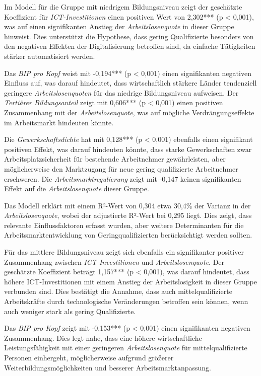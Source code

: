 Im Modell für die Gruppe mit niedrigem Bildungsniveau zeigt der geschätzte Koeffizient 
für \textit{\ac{ICT}-Investitionen} einen positiven Wert von 2,302*** (p < 0,001), was 
auf einen signifikanten Anstieg der \textit{Arbeitslosenquote} in dieser Gruppe hinweist. 
Dies unterstützt die Hypothese, dass gering Qualifizierte besonders von den negativen 
Effekten der Digitalisierung betroffen sind, da einfache Tätigkeiten stärker automatisiert 
werden.

Das \textit{\ac{BIP} pro Kopf} weist mit -0,194*** (p < 0,001) einen signifikanten 
negativen Einfluss auf, was darauf hindeutet, dass wirtschaftlich stärkere Länder 
tendenziell geringere \textit{Arbeitslosenquoten} für das niedrige Bildungsniveau 
aufweisen. Der \textit{Tertiärer Bildungsanteil} zeigt mit 0,606*** (p < 0,001) einen 
positiven Zusammenhang mit der \textit{Arbeitslosenquote}, was auf mögliche 
Verdrängungseffekte im Arbeitsmarkt hindeuten könnte.

Die \textit{Gewerkschaftsdichte} hat mit 0,128*** (p < 0,001) ebenfalls einen signifikant 
positiven Effekt, was darauf hindeuten könnte, dass starke Gewerkschaften zwar 
Arbeitsplatzsicherheit für bestehende Arbeitnehmer gewährleisten, aber möglicherweise den 
Marktzugang für neue gering qualifizierte Arbeitnehmer erschweren. Die 
\textit{Arbeitsmarktregulierung} zeigt mit -0,147 keinen signifikanten Effekt auf die 
\textit{Arbeitslosenquote} dieser Gruppe.

Das Modell erklärt mit einem R²-Wert von 0,304 etwa 30,4\% der Varianz in der 
\textit{Arbeitslosenquote}, wobei der adjustierte R²-Wert bei 0,295 liegt. Dies zeigt, dass 
relevante Einflussfaktoren erfasst wurden, aber weitere Determinanten für die 
Arbeitsmarktentwicklung von Geringqualifizierten berücksichtigt werden sollten.

Für das mittlere Bildungsniveau zeigt sich ebenfalls ein signifikanter positiver 
Zusammenhang zwischen \textit{\ac{ICT}-Investitionen} und \textit{Arbeitslosenquote}. 
Der geschätzte Koeffizient beträgt 1,157*** (p < 0,001), was darauf hindeutet, dass 
höhere \ac{ICT}-Investitionen mit einem Anstieg der Arbeitslosigkeit in dieser Gruppe 
verbunden sind. Dies bestätigt die Annahme, dass auch mittelqualifizierte Arbeitskräfte 
durch technologische Veränderungen betroffen sein können, wenn auch weniger stark als 
gering Qualifizierte.

Das \textit{\ac{BIP} pro Kopf} zeigt mit -0,153*** (p < 0,001) einen signifikanten 
negativen Zusammenhang. Dies legt nahe, dass eine höhere wirtschaftliche Leistungsfähigkeit 
mit einer geringeren \textit{Arbeitslosenquote} für mittelqualifizierte Personen einhergeht, 
möglicherweise aufgrund größerer Weiterbildungsmöglichkeiten und besserer 
Arbeitsmarktanpassung.


